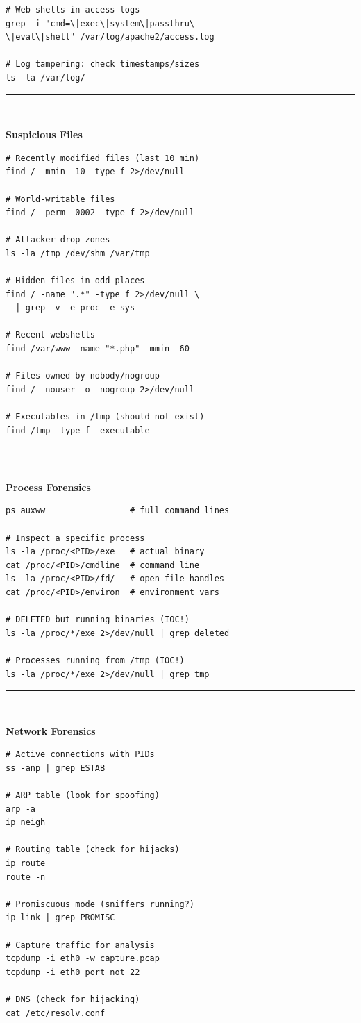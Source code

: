 \documentclass[10pt,landscape]{article}
\newcommand{\colorsec}[2]{%
  \vspace{1.5ex plus 0.5ex minus 0.5ex}%
  \noindent\rule{\linewidth}{0.4pt}\\[-0.7ex]%
  \noindent\colorbox{#1}{\parbox{\dimexpr\linewidth-2\fboxsep}{%
    \strut\textbf{\normalsize\color{sblue} #2}}}%
  \vspace{0.5ex}\par\nobreak%
}
\begin{document}
\begin{multicols}{3}
\begin{lstlisting}
# Web shells in access logs
grep -i "cmd=\|exec\|system\|passthru\
\|eval\|shell" /var/log/apache2/access.log

# Log tampering: check timestamps/sizes
ls -la /var/log/
\end{lstlisting}

\colorsec{secteal}{Suspicious Files}
\begin{lstlisting}
# Recently modified files (last 10 min)
find / -mmin -10 -type f 2>/dev/null

# World-writable files
find / -perm -0002 -type f 2>/dev/null

# Attacker drop zones
ls -la /tmp /dev/shm /var/tmp

# Hidden files in odd places
find / -name ".*" -type f 2>/dev/null \
  | grep -v -e proc -e sys

# Recent webshells
find /var/www -name "*.php" -mmin -60

# Files owned by nobody/nogroup
find / -nouser -o -nogroup 2>/dev/null

# Executables in /tmp (should not exist)
find /tmp -type f -executable
\end{lstlisting}

\colorsec{secteal}{Process Forensics}
\begin{lstlisting}
ps auxww                 # full command lines

# Inspect a specific process
ls -la /proc/<PID>/exe   # actual binary
cat /proc/<PID>/cmdline  # command line
ls -la /proc/<PID>/fd/   # open file handles
cat /proc/<PID>/environ  # environment vars

# DELETED but running binaries (IOC!)
ls -la /proc/*/exe 2>/dev/null | grep deleted

# Processes running from /tmp (IOC!)
ls -la /proc/*/exe 2>/dev/null | grep tmp
\end{lstlisting}

\colorsec{secteal}{Network Forensics}
\begin{lstlisting}
# Active connections with PIDs
ss -anp | grep ESTAB

# ARP table (look for spoofing)
arp -a
ip neigh

# Routing table (check for hijacks)
ip route
route -n

# Promiscuous mode (sniffers running?)
ip link | grep PROMISC

# Capture traffic for analysis
tcpdump -i eth0 -w capture.pcap
tcpdump -i eth0 port not 22

# DNS (check for hijacking)
cat /etc/resolv.conf
\end{lstlisting}


\end{multicols}
\end{document}
